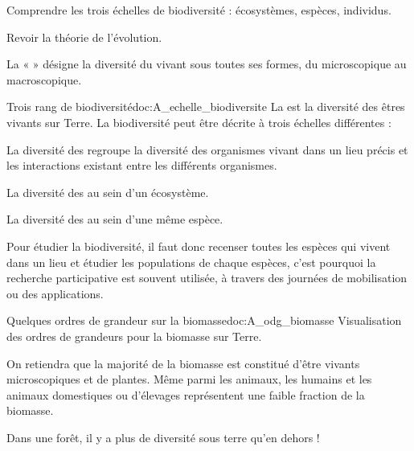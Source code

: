 \begin{multicols}{2}
\begin{objectifs}
  \item Comprendre les trois échelles de biodiversité : écosystèmes, espèces, individus.
  \item Revoir la théorie de l'évolution.
\end{objectifs}

\begin{contexte}
  La «  » désigne la diversité du vivant sous toutes ses formes, du microscopique au macroscopique.
  
\end{contexte}
\begin{doc}{Trois rang de biodiversité}{doc:A_echelle_biodiversite}
  La  est la diversité des êtres vivants sur Terre. 
  La biodiversité peut être décrite à trois échelles différentes :
  \begin{listePoints}
    \item La diversité des  regroupe la diversité des organismes vivant dans un lieu précis et les interactions existant entre les différents organismes.
    \item La diversité des  au sein d'un écosystème.
    \item La diversité des  au sein d'une même espèce.
  \end{listePoints}

  Pour étudier la biodiversité, il faut donc recenser toutes les espèces qui vivent dans un lieu et étudier les populations de chaque espèces, c'est pourquoi la recherche participative est souvent utilisée, à travers des journées de mobilisation ou des applications.
\end{doc}

\begin{doc}{Quelques ordres de grandeur sur la biomasse}{doc:A_odg_biomasse}
  \textcolor{couleurPrim}{\faArrowLeft} Visualisation des ordres de grandeurs pour la biomasse sur Terre.

  On retiendra que la majorité de la biomasse est constitué d'être vivants microscopiques et de plantes.
  Même parmi les animaux, les humains et les animaux domestiques ou d'élevages représentent une faible fraction de la biomasse.
  
  Dans une forêt, il y a plus de diversité sous terre qu'en dehors !
\end{doc}

\end{multicols}


